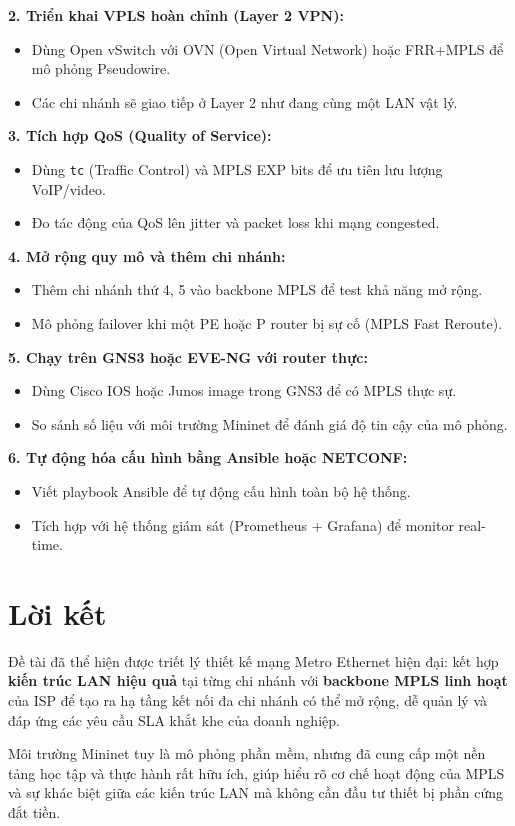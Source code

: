 \textbf{2. Triển khai VPLS hoàn chỉnh (Layer 2 VPN):}
\begin{itemize}
    \item Dùng Open vSwitch với OVN (Open Virtual Network) hoặc FRR+MPLS để mô phỏng Pseudowire.
    \item Các chi nhánh sẽ giao tiếp ở Layer 2 như đang cùng một LAN vật lý.
\end{itemize}

\textbf{3. Tích hợp QoS (Quality of Service):}
\begin{itemize}
    \item Dùng \texttt{tc} (Traffic Control) và MPLS EXP bits để ưu tiên lưu lượng VoIP/video.
    \item Đo tác động của QoS lên jitter và packet loss khi mạng congested.
\end{itemize}

\textbf{4. Mở rộng quy mô và thêm chi nhánh:}
\begin{itemize}
    \item Thêm chi nhánh thứ 4, 5 vào backbone MPLS để test khả năng mở rộng.
    \item Mô phỏng failover khi một PE hoặc P router bị sự cố (MPLS Fast Reroute).
\end{itemize}

\textbf{5. Chạy trên GNS3 hoặc EVE-NG với router thực:}
\begin{itemize}
    \item Dùng Cisco IOS hoặc Junos image trong GNS3 để có MPLS thực sự.
    \item So sánh số liệu với môi trường Mininet để đánh giá độ tin cậy của mô phỏng.
\end{itemize}

\textbf{6. Tự động hóa cấu hình bằng Ansible hoặc NETCONF:}
\begin{itemize}
    \item Viết playbook Ansible để tự động cấu hình toàn bộ hệ thống.
    \item Tích hợp với hệ thống giám sát (Prometheus + Grafana) để monitor real-time.
\end{itemize}

\section{Lời kết}

Đề tài đã thể hiện được triết lý thiết kế mạng Metro Ethernet hiện đại: kết hợp \textbf{kiến trúc LAN hiệu quả} tại từng chi nhánh với \textbf{backbone MPLS linh hoạt} của ISP để tạo ra hạ tầng kết nối đa chi nhánh có thể mở rộng, dễ quản lý và đáp ứng các yêu cầu SLA khắt khe của doanh nghiệp.

Môi trường Mininet tuy là mô phỏng phần mềm, nhưng đã cung cấp một nền tảng học tập và thực hành rất hữu ích, giúp hiểu rõ cơ chế hoạt động của MPLS và sự khác biệt giữa các kiến trúc LAN mà không cần đầu tư thiết bị phần cứng đắt tiền.
